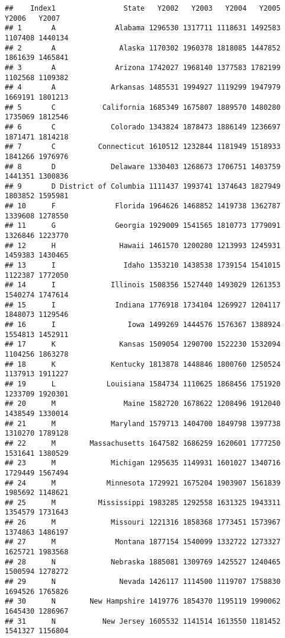 \documentclass[
]{article}
\begin{document}
\begin{verbatim}
##    Index1                State   Y2002   Y2003   Y2004   Y2005   Y2006   Y2007
## 1       A              Alabama 1296530 1317711 1118631 1492583 1107408 1440134
## 2       A               Alaska 1170302 1960378 1818085 1447852 1861639 1465841
## 3       A              Arizona 1742027 1968140 1377583 1782199 1102568 1109382
## 4       A             Arkansas 1485531 1994927 1119299 1947979 1669191 1801213
## 5       C           California 1685349 1675807 1889570 1480280 1735069 1812546
## 6       C             Colorado 1343824 1878473 1886149 1236697 1871471 1814218
## 7       C          Connecticut 1610512 1232844 1181949 1518933 1841266 1976976
## 8       D             Delaware 1330403 1268673 1706751 1403759 1441351 1300836
## 9       D District of Columbia 1111437 1993741 1374643 1827949 1803852 1595981
## 10      F              Florida 1964626 1468852 1419738 1362787 1339608 1278550
## 11      G              Georgia 1929009 1541565 1810773 1779091 1326846 1223770
## 12      H               Hawaii 1461570 1200280 1213993 1245931 1459383 1430465
## 13      I                Idaho 1353210 1438538 1739154 1541015 1122387 1772050
## 14      I             Illinois 1508356 1527440 1493029 1261353 1540274 1747614
## 15      I              Indiana 1776918 1734104 1269927 1204117 1848073 1129546
## 16      I                 Iowa 1499269 1444576 1576367 1388924 1554813 1452911
## 17      K               Kansas 1509054 1290700 1522230 1532094 1104256 1863278
## 18      K             Kentucky 1813878 1448846 1800760 1250524 1137913 1911227
## 19      L            Louisiana 1584734 1110625 1868456 1751920 1233709 1920301
## 20      M                Maine 1582720 1678622 1208496 1912040 1438549 1330014
## 21      M             Maryland 1579713 1404700 1849798 1397738 1310270 1789128
## 22      M        Massachusetts 1647582 1686259 1620601 1777250 1531641 1380529
## 23      M             Michigan 1295635 1149931 1601027 1340716 1729449 1567494
## 24      M            Minnesota 1729921 1675204 1903907 1561839 1985692 1148621
## 25      M          Mississippi 1983285 1292558 1631325 1943311 1354579 1731643
## 26      M             Missouri 1221316 1858368 1773451 1573967 1374863 1486197
## 27      M              Montana 1877154 1540099 1332722 1273327 1625721 1983568
## 28      N             Nebraska 1885081 1309769 1425527 1240465 1500594 1278272
## 29      N               Nevada 1426117 1114500 1119707 1758830 1694526 1765826
## 30      N        New Hampshire 1419776 1854370 1195119 1990062 1645430 1286967
## 31      N           New Jersey 1605532 1141514 1613550 1181452 1541327 1156804

\end{verbatim}
\end{document}
